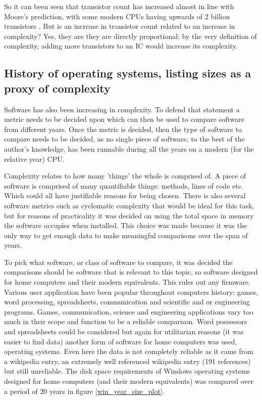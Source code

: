So it can been seen that transistor count has increased almost in line with Moore's prediction, with some modern CPUs having upwards of 2 billion transistors \cite{2Bbeast}. But is an increase in transistor count related to an increase in complexity? Yes, they are they are directly proportional; by the very definition of complexity, adding more transistors to an IC would increase its complexity.

\subsection{History of operating systems, listing sizes as a proxy of complexity}
Software has also been increasing in complexity. To defend that statement a metric needs to be decided upon which can then be used to compare software from different years. Once the metric is decided, then the type of software to compare needs to be decided, as no single piece of software, to the best of the author's knowledge, has been runnable during all the years on a modern (for the relative year) CPU.

Complexity relates to how many 'things' the whole is comprised of. A piece of software is comprised of many quantifiable things: methods, lines of code etc. Which could all have justifiable reasons for being chosen. There is also several software metrics such as cyclomatic complexity that would be ideal for this task, but for reasons of practicality it was decided on using the total space in memory the software occupies when installed. This choice was made because it was the only way to get enough data to make meaningful comparisons over the span of years.

To pick what software, or class of software to compare, it was decided the comparisons should be software that is relevant to this topic, so software designed for home computers and their modern equivalents. This rules out any firmware. Various user application have been popular throughout computers history: games, word processing, spreadsheets, communication and scientific and or engineering  programs. Games, communication, science and engineering applications vary too much in their scope and function to be a reliable comparison. Word possessors and spreadsheets could be considered but again for utilitarian reasons (it was easier to find data) another form of software for home computers was used, operating systems. Even here the data is not completely reliable as it came from a wikipedia entry, an extremely well referenced wikipedia entry (191 references) but still unreliable. The disk space requirements of Windows operating systems designed for home computers (and their modern equivalents) was compared over a period of 20 years in figure \ref{win_year_size_plot}.

